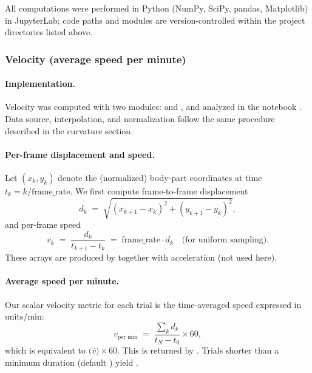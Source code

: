 All computations were performed in Python (NumPy, SciPy, pandas, Matplotlib) in JupyterLab; code paths and modules are version-controlled within the project directories listed above.


\subsubsection{Velocity (average speed per minute)}

\paragraph{Implementation.}
Velocity was computed with two modules: \href{https://github.com/atanugiri/GhrelinBehaviorQuantification/blob/main/Python_scripts/Feature_functions/motion_features.py}{} and \href{https://github.com/atanugiri/GhrelinBehaviorQuantification/blob/main/Python_scripts/Feature_functions/motion_features_per_minute.py}{}, and analyzed in the notebook \href{https://github.com/atanugiri/GhrelinBehaviorQuantification/blob/main/DLC-Jupyter-Notebooks/31_data_analysis_distance.ipynb}{}. Data source, interpolation, and normalization follow the same procedure described in the curvature section.

\paragraph{Per-frame displacement and speed.}
Let $(x_k, y_k)$ denote the (normalized) body-part coordinates at time $t_k = k/\mathrm{frame\_rate}$. We first compute frame-to-frame displacement
\[
d_k \;=\; \sqrt{(x_{k+1}-x_k)^2 + (y_{k+1}-y_k)^2},
\]
and per-frame speed
\[
v_k \;=\; \frac{d_k}{t_{k+1}-t_k} \;=\; \mathrm{frame\_rate}\cdot d_k \quad \text{(for uniform sampling)}.
\]
These arrays are produced by  together with acceleration (not used here).

\paragraph{Average speed per minute.}
Our scalar velocity metric for each trial is the time-averaged speed expressed in units/min:
\[
v_{\mathrm{per\;min}} \;=\; \frac{\sum_k d_k}{t_{N}-t_0}\times 60,
\]
which is equivalent to $\big(\overline{v}\big)\times 60$. This is returned by . Trials shorter than a minimum duration (default ) yield .

